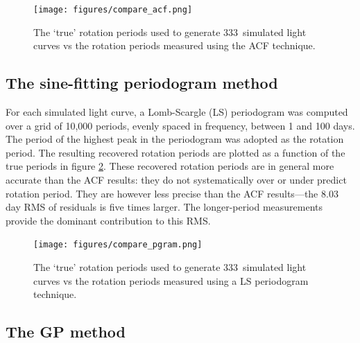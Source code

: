 \documentclass[useAMS, usenatbib, preprint, 12pt]{aastex}
\newcommand{\nlightcurves}{333}
\begin{document}
\begin{figure}
\begin{center}
\texttt{[image: figures/compare\_acf.png]}
\caption[ACF results.]
{The `true' rotation periods used to generate \nlightcurves\ simulated light
curves vs the rotation periods measured using the ACF technique.}
\label{fig:compare_acf}
\end{center}
\end{figure}

\subsection{The sine-fitting periodogram method}

For each simulated light curve, a Lomb-Scargle (LS) periodogram
\citep{Lomb1976, Scargle1982} was computed over a grid of 10,000 periods,
evenly spaced in frequency, between 1 and 100 days.
The period of the highest peak in the periodogram was adopted as the rotation
period.
The resulting recovered rotation periods are plotted as a function of the true
periods in figure \ref{fig:pgram_compare}.
These recovered rotation periods are in general more accurate than the ACF
results: they do not systematically over or under predict rotation period.
They are however less precise than the ACF results---the 8.03 day RMS of
residuals is five times larger.
The longer-period measurements provide the dominant contribution to this RMS.

\begin{figure}
\begin{center}
\texttt{[image: figures/compare\_pgram.png]}
\caption[LS periodogram results.]
{The `true' rotation periods used to generate \nlightcurves\ simulated light
curves vs the rotation periods measured using a LS periodogram technique.}
\label{fig:pgram_compare}
\end{center}
\end{figure}

\subsection{The GP method}
\end{document}
